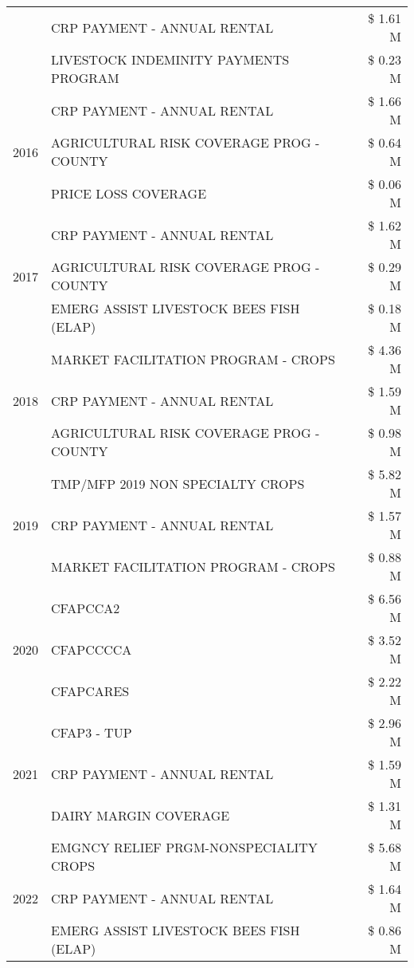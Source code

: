 \begin{tabular}{llr}
 & CRP PAYMENT - ANNUAL RENTAL & \$ 1.61 M \\
 & LIVESTOCK INDEMINITY PAYMENTS PROGRAM & \$ 0.23 M \\
\cline{1-3}
\multirow[t]{3}{*}{2016} & CRP PAYMENT - ANNUAL RENTAL & \$ 1.66 M \\
 & AGRICULTURAL RISK COVERAGE PROG - COUNTY & \$ 0.64 M \\
 & PRICE LOSS COVERAGE & \$ 0.06 M \\
\cline{1-3}
\multirow[t]{3}{*}{2017} & CRP PAYMENT - ANNUAL RENTAL & \$ 1.62 M \\
 & AGRICULTURAL RISK COVERAGE PROG - COUNTY & \$ 0.29 M \\
 & EMERG ASSIST LIVESTOCK BEES FISH (ELAP) & \$ 0.18 M \\
\cline{1-3}
\multirow[t]{3}{*}{2018} & MARKET FACILITATION PROGRAM - CROPS & \$ 4.36 M \\
 & CRP PAYMENT - ANNUAL RENTAL & \$ 1.59 M \\
 & AGRICULTURAL RISK COVERAGE PROG - COUNTY & \$ 0.98 M \\
\cline{1-3}
\multirow[t]{3}{*}{2019} & TMP/MFP 2019 NON SPECIALTY CROPS & \$ 5.82 M \\
 & CRP PAYMENT - ANNUAL RENTAL & \$ 1.57 M \\
 & MARKET FACILITATION PROGRAM - CROPS & \$ 0.88 M \\
\cline{1-3}
\multirow[t]{3}{*}{2020} & CFAPCCA2 & \$ 6.56 M \\
 & CFAPCCCCA & \$ 3.52 M \\
 & CFAPCARES & \$ 2.22 M \\
\cline{1-3}
\multirow[t]{3}{*}{2021} & CFAP3 - TUP & \$ 2.96 M \\
 & CRP PAYMENT - ANNUAL RENTAL & \$ 1.59 M \\
 & DAIRY MARGIN COVERAGE & \$ 1.31 M \\
\cline{1-3}
\multirow[t]{3}{*}{2022} & EMGNCY RELIEF PRGM-NONSPECIALITY CROPS & \$ 5.68 M \\
 & CRP PAYMENT - ANNUAL RENTAL & \$ 1.64 M \\
 & EMERG ASSIST LIVESTOCK BEES FISH (ELAP) & \$ 0.86 M \\
\cline{1-3}
\bottomrule
\end{tabular}
